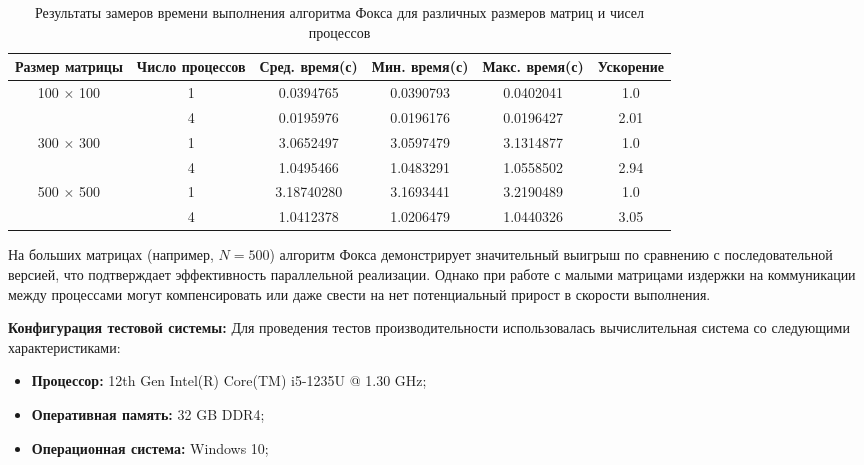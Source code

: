 \documentclass{report}
\begin{document}
\begin{table}[h]
    \centering
    \caption{Результаты замеров времени выполнения алгоритма Фокса для различных размеров матриц и чисел процессов}
    \label{tab:performance_tests}
    \begin{tabular}{|c|c|c|c|c|c|}
        \hline
        \textbf{Размер матрицы} & \textbf{Число процессов} & \textbf{Сред. время(с)} & \textbf{Мин. время(с)} & \textbf{Макс. время(с)} & \textbf{Ускорение} \\
        \hline
        \multirow{2}{*}{100 $\times$ 100} & 1  & 0.0394765 & 0.0390793 & 0.0402041 & 1.0 \\
        \cline{2-6}
                                         & 4  & 0.0195976 & 0.0196176 & 0.0196427 & 2.01 \\
        \hline
        \multirow{2}{*}{300 $\times$ 300} & 1  & 3.0652497 & 3.0597479 & 3.1314877 & 1.0 \\
        \cline{2-6}
                                         & 4  & 1.0495466 & 1.0483291 & 1.0558502 & 2.94 \\
        \hline
        \multirow{2}{*}{500 $\times$ 500} & 1  & 3.18740280 & 3.1693441 & 3.2190489 & 1.0 \\
        \cline{2-6}
                                         & 4  & 1.0412378 & 1.0206479 & 1.0440326 & 3.05 \\
        \hline
    \end{tabular}
\end{table}

На больших матрицах (например, $N=500$) алгоритм Фокса демонстрирует значительный выигрыш по сравнению с последовательной версией, что подтверждает эффективность параллельной реализации. Однако при работе с малыми матрицами издержки на коммуникации между процессами могут компенсировать или даже свести на нет потенциальный прирост в скорости выполнения.

\textbf{Конфигурация тестовой системы:} Для проведения тестов производительности использовалась вычислительная система со следующими характеристиками:

\begin{itemize}
    \item \textbf{Процессор:} 12th Gen Intel(R) Core(TM) i5-1235U @ 1.30 GHz;
    \item \textbf{Оперативная память:} 32 GB DDR4;
    \item \textbf{Операционная система:} Windows 10;
\end{itemize}
\end{document}
